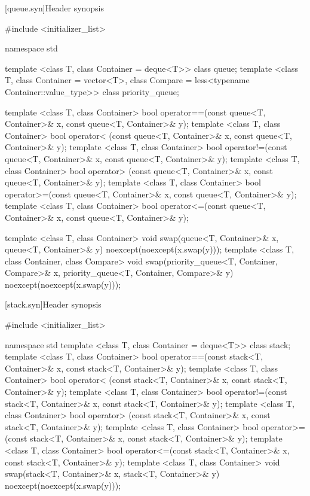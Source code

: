 [queue.syn]{Header  synopsis}%

\begin{codeblock}
#include <initializer_list>

namespace std {
  template <class T, class Container = deque<T>> class queue;
  template <class T, class Container = vector<T>,
            class Compare = less<typename Container::value_type>>
    class priority_queue;

  template <class T, class Container>
    bool operator==(const queue<T, Container>& x, const queue<T, Container>& y);
  template <class T, class Container>
    bool operator< (const queue<T, Container>& x, const queue<T, Container>& y);
  template <class T, class Container>
    bool operator!=(const queue<T, Container>& x, const queue<T, Container>& y);
  template <class T, class Container>
    bool operator> (const queue<T, Container>& x, const queue<T, Container>& y);
  template <class T, class Container>
    bool operator>=(const queue<T, Container>& x, const queue<T, Container>& y);
  template <class T, class Container>
    bool operator<=(const queue<T, Container>& x, const queue<T, Container>& y);

  template <class T, class Container>
    void swap(queue<T, Container>& x, queue<T, Container>& y) noexcept(noexcept(x.swap(y)));
  template <class T, class Container, class Compare>
    void swap(priority_queue<T, Container, Compare>& x,
              priority_queue<T, Container, Compare>& y) noexcept(noexcept(x.swap(y)));
}
\end{codeblock}

[stack.syn]{Header  synopsis}%

\begin{codeblock}
#include <initializer_list>

namespace std {
  template <class T, class Container = deque<T>> class stack;
  template <class T, class Container>
    bool operator==(const stack<T, Container>& x, const stack<T, Container>& y);
  template <class T, class Container>
    bool operator< (const stack<T, Container>& x, const stack<T, Container>& y);
  template <class T, class Container>
    bool operator!=(const stack<T, Container>& x, const stack<T, Container>& y);
  template <class T, class Container>
    bool operator> (const stack<T, Container>& x, const stack<T, Container>& y);
  template <class T, class Container>
    bool operator>=(const stack<T, Container>& x, const stack<T, Container>& y);
  template <class T, class Container>
    bool operator<=(const stack<T, Container>& x, const stack<T, Container>& y);
  template <class T, class Container>
    void swap(stack<T, Container>& x, stack<T, Container>& y) noexcept(noexcept(x.swap(y)));
}
\end{codeblock}

